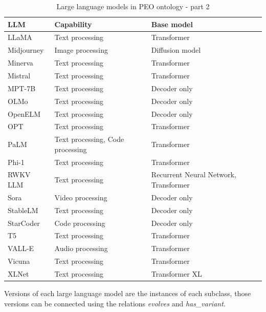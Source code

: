 \begin{table}[H]
    \centering
    \begin{tabular}{|>{\raggedright\arraybackslash}p{4cm}|>{\raggedright\arraybackslash}p{4cm}|>{\raggedright\arraybackslash}p{4cm}|}
        \hline
        \textbf{LLM} & \textbf{Capability} & \textbf{Base model} \\ \hline
        LLaMA & Text processing & Transformer \\ \hline
        Midjourney & Image processing & Diffusion model  \\ \hline
        Minerva & Text processing & Transformer \\ \hline
        Mistral & Text processing & Transformer \\ \hline
        MPT-7B & Text processing & Decoder only \\ \hline
        OLMo & Text processing & Decoder only \\ \hline
        OpenELM & Text processing & Decoder only \\ \hline
        OPT & Text processing & Transformer \\ \hline
        PaLM & Text processing, Code processing & Transformer \\ \hline
        Phi-1 & Text processing & Transformer \\ \hline
        RWKV LLM & Text processing & Recurrent Neural Network, Transformer \\ \hline
        Sora & Video processing & Decoder only \\ \hline
        StableLM & Text processing & Decoder only \\ \hline
        StarCoder & Code processing & Decoder only \\ \hline
        T5 & Text processing & Transformer \\ \hline
        VALL-E & Audio processing & Transformer \\ \hline
        Vicuna & Text processing & Transformer \\ \hline
        XLNet & Text processing & Transformer XL \\ \hline
    \end{tabular}
    \caption{Large language models in PEO ontology - part 2}
\end{table}




Versions of each large language model are the instances of each subclass, those versions can be connected using the relations \textit{evolves} and \textit{has\_variant.}


